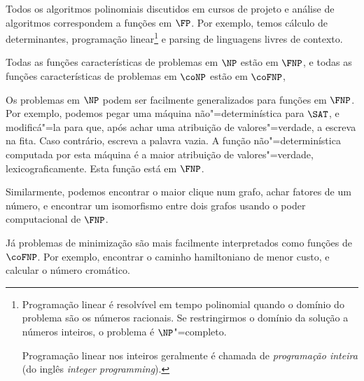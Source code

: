 \begin{example}
    Todos os algoritmos polinomiais
    discutidos em cursos de projeto e análise de algoritmos
    correspondem a funções em $\FP$.
    Por exemplo,
    temos cálculo de determinantes,
    programação linear\footnote{
        Programação linear é resolvível em tempo polinomial
        quando o domínio do problema são os números racionais.
        Se restringirmos o domínio da solução a números inteiros,
        o problema é $\NP$"=completo.

        Programação linear nos inteiros geralmente é chamada de
        \emph{programação inteira}
        (do inglês \emph{integer programming}).
    }
    e parsing de linguagens livres de contexto.
\end{example}

\begin{uproposition}
    Todas as funções características de problemas em $\NP$ estão em $\FNP$,
    e todas as funções características de problemas em $\coNP$ estão em $\coFNP$,
\end{uproposition}

\begin{example}
    Os problemas em $\NP$ podem ser facilmente generalizados para funções em $\FNP$.
    Por exemplo,
    podemos pegar uma máquina não"=determinística para $\SAT$,
    e modificá"=la para que,
    após achar uma atribuição de valores"=verdade,
    a escreva na fita.
    Caso contrário,
    escreva a palavra vazia.
    A função não"=determinística computada por esta máquina
    é a maior atribuição de valores"=verdade,
    lexicograficamente.
    Esta função está em $\FNP$.

    Similarmente,
    podemos encontrar o maior clique num grafo,
    achar fatores de um número,
    e encontrar um isomorfismo entre dois grafos
    usando o poder computacional de $\FNP$.

    Já problemas de minimização
    são mais facilmente interpretados como funções de $\coFNP$.
    Por exemplo,
    encontrar o caminho hamiltoniano de menor custo,
    e calcular o número cromático.
\end{example}
